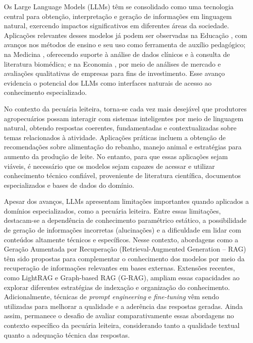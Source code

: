 
Os Large Language Models (LLMs) têm se consolidado como uma tecnologia central para obtenção, interpretação e geração de informações em linguagem natural, exercendo impactos significativos em diferentes áreas da sociedade. Aplicações relevantes desses modelos já podem ser observadas na Educação \cite{IAeChatGPT}, com avanços nos métodos de ensino e seu uso como ferramenta de auxílio pedagógico; na Medicina \cite{ChatGPTInMedicice}, oferecendo suporte à análise de dados clínicos e à consulta de literatura biomédica; e na Economia \cite{EconomieAndLLM}, por meio de análises de mercado e avaliações qualitativas de empresas para fins de investimento. Esse avanço evidencia o potencial dos LLMs como interfaces naturais de acesso ao conhecimento especializado.

No contexto da pecuária leiteira, torna-se cada vez mais desejável que produtores agropecuários possam interagir com sistemas inteligentes por meio de linguagem natural, obtendo respostas coerentes, fundamentadas e contextualizadas sobre temas relacionados à atividade. Aplicações práticas incluem a obtenção de recomendações sobre alimentação do rebanho, manejo animal e estratégias para aumento da produção de leite. No entanto, para que essas aplicações sejam viáveis, é necessário que os modelos sejam capazes de acessar e utilizar conhecimento técnico confiável, proveniente de literatura científica, documentos especializados e bases de dados do domínio.

Apesar dos avanços, LLMs apresentam limitações importantes quando aplicados a domínios especializados, como a pecuária leiteira. Entre essas limitações, destacam-se a dependência de conhecimento paramétrico estático, a possibilidade de geração de informações incorretas (alucinações) e a dificuldade em lidar com conteúdos altamente técnicos e específicos. Nesse contexto, abordagens como a Geração Aumentada por Recuperação (Retrieval-Augmented Generation -- RAG) \cite{RAG} têm sido propostas para complementar o conhecimento dos modelos por meio da recuperação de informações relevantes em bases externas. Extensões recentes, como LightRAG e Graph-based RAG (G-RAG), ampliam essas capacidades ao explorar diferentes estratégias de indexação e organização do conhecimento. Adicionalmente, técnicas de \textit{prompt engineering} e \textit{fine-tuning} vêm sendo utilizadas para melhorar a qualidade e a aderência das respostas geradas. Ainda assim, permanece o desafio de avaliar comparativamente essas abordagens no contexto específico da pecuária leiteira, considerando tanto a qualidade textual quanto a adequação técnica das respostas.

